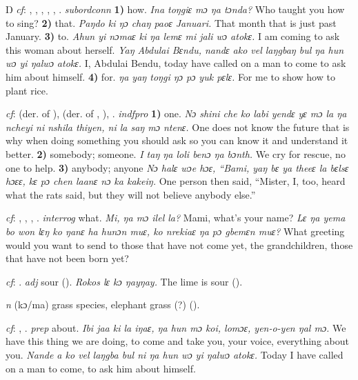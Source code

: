 \begin{letter}{Ŋ}
 \textit{cf}: , , , , , . \textit{subordconn} \textbf{1)} how. \textit{Ina toŋgiɛ mɔ ŋa tɔnda?} Who taught you how to sing? \textbf{2)} that. \textit{Paŋdo ki ŋɔ chaŋ paoɛ Januari.} That month that is just past January. \textbf{3)} to. \textit{Ahun yi nɔmaɛ ki ŋa lemɛ mi jali wɔ atokɛ.} I am coming to ask this woman about herself. \textit{Yaŋ Abdulai Bɛndu, nandɛ ako vel laŋgbaŋ bul ŋa hun wɔ yi ŋalwɔ atokɛ.} I, Abdulai Bendu, today have called on a man to come to ask him about himself. \textbf{4)} for. \textit{ŋa yaŋ toŋgi ŋɔ pɔ yuk pɛlɛ.} For me to show how to plant rice.

 \textit{cf}:  (der. of ),  (der. of , ), . \textit{indfpro} \textbf{1)} one. \textit{Nɔ shini che ko labi yendɛ yɛ mɔ la ŋa ncheyi ni nshila thiyen, ni la saŋ mɔ ntenɛ.} One does not know the future that is why when doing something you should ask so you can know it and understand it better. \textbf{2)} somebody; someone. \textit{I taŋ ŋa loli benɔ ŋa bɔnth.} We cry for rescue, no one to help. \textbf{3)} anybody; anyone \textit{Nɔ halɛ wɔe hɔɛ, “Bami, yaŋ bɛ ya theeɛ la bɛlsɛ hɔɛɛ, kɛ pɔ chen laanɛ nɔ ka kakeiŋ.} One person then said, “Mister, I, too, heard what the rats said, but they will not believe anybody else.”

 \textit{cf}: , , , . \textit{interrog} what. \textit{Mi, ŋa mɔ ilel la?} Mami, what's your name? \textit{Lɛ ŋa yema bo won lɛŋ ko ŋanɛ ha hunɔn muɛ, ko nrekiaɛ ŋa pɔ gbemɛn muɛ?} What greeting would you want to send to those that have not come yet, the grandchildren, those that have not been born yet?

 \textit{cf}: . \textit{adj} sour (\citealt{Pichl1967}). \textit{Rokos lɛ kɔ ŋayŋay.} The lime is sour (\citealt{Pichl1967}).

 \textit{n} (kɔ/ma) grass species, elephant grass (?) (\citealt{Pichl1967}). 

 \textit{cf}: , . \textit{prep} about. \textit{Ibi jaa ki la iŋaɛ, ŋa hun mɔ koi, lomɔɛ, yen-o-yen ŋal mɔ.} We have this thing we are doing, to come and take you, your voice, everything about you. \textit{Nande a ko vel laŋgba bul ni ŋa hun wɔ yi ŋalwɔ atokɛ.} Today I have called on a man to come, to ask him about himself.


\end{letter}

